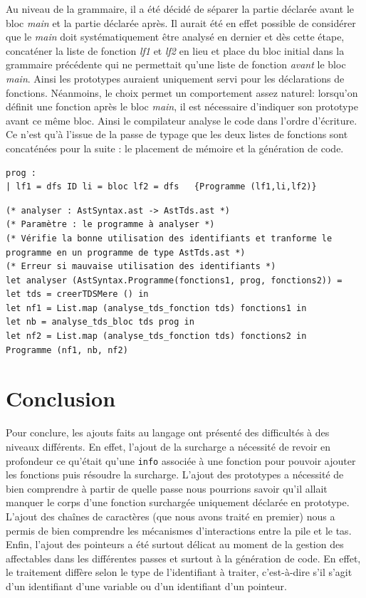 \documentclass[11pt,a4paper]{article}
\begin{document}
Au niveau de la grammaire, il a été décidé de séparer la partie déclarée avant le bloc \emph{main} et la partie déclarée après. Il aurait été en effet possible de considérer que le \emph{main} doit systématiquement être analysé en dernier et dès cette étape, concaténer la liste de fonction \emph{lf1} et \emph{lf2} en lieu et place du bloc initial dans la grammaire précédente qui ne permettait qu'une liste de fonction \emph{avant} le bloc \emph{main}. Ainsi les prototypes auraient uniquement servi pour les déclarations de fonctions. Néanmoins, le choix permet un comportement assez naturel: lorsqu'on définit une fonction après le bloc \emph{main}, il est nécessaire d'indiquer son prototype avant ce même bloc. Ainsi le compilateur analyse le code dans l'ordre d'écriture. Ce n'est qu'à l'issue de la passe de typage que les deux listes de fonctions sont concaténées pour la suite : le placement de mémoire et la génération de code.

\begin{verbatim}
prog :
| lf1 = dfs ID li = bloc lf2 = dfs   {Programme (lf1,li,lf2)}
\end{verbatim}

\begin{verbatim}
(* analyser : AstSyntax.ast -> AstTds.ast *)
(* Paramètre : le programme à analyser *)
(* Vérifie la bonne utilisation des identifiants et tranforme le 
programme en un programme de type AstTds.ast *)
(* Erreur si mauvaise utilisation des identifiants *)
let analyser (AstSyntax.Programme(fonctions1, prog, fonctions2)) =
let tds = creerTDSMere () in
let nf1 = List.map (analyse_tds_fonction tds) fonctions1 in
let nb = analyse_tds_bloc tds prog in
let nf2 = List.map (analyse_tds_fonction tds) fonctions2 in
Programme (nf1, nb, nf2)
\end{verbatim}

\section{Conclusion}

Pour conclure, les ajouts faits au langage ont présenté des difficultés à des niveaux différents. En effet, l'ajout de la surcharge a nécessité de revoir en profondeur ce qu'était qu'une \texttt{info} associée à une fonction pour pouvoir ajouter les fonctions puis résoudre la surcharge. L'ajout des prototypes a nécessité de bien comprendre à partir de quelle passe nous pourrions savoir qu'il allait manquer le corps d'une fonction surchargée uniquement déclarée en prototype. L'ajout des chaînes de caractères (que nous avons traité en premier) nous a permis de bien comprendre les mécanismes d'interactions entre la pile et le tas. Enfin, l'ajout des pointeurs a été surtout délicat au moment de la gestion des affectables dans les différentes passes et surtout à la génération de code. En effet, le traitement diffère selon le type de l'identifiant à traiter, c'est-à-dire s'il s'agit d'un identifiant d'une variable ou d'un identifiant d'un pointeur.
\end{document}
